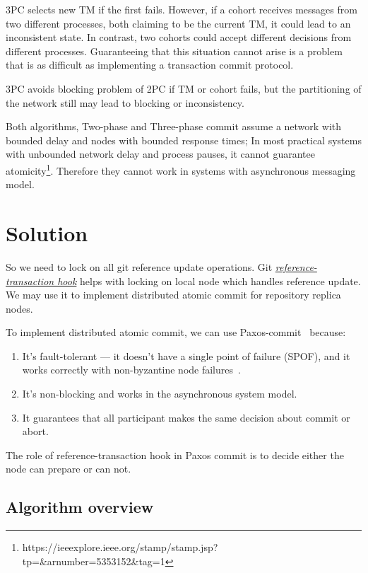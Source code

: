 \documentclass[sigplan, screen, nonacm, 11pt]{acmart}
\begin{document}
3PC selects new TM if the first fails.
However, if a cohort receives messages from two different processes,
both claiming to be the current TM, it could lead to an inconsistent state.
In contrast, two cohorts could accept different decisions from different processes.
Guaranteeing that this situation cannot arise is a problem
that is as difficult as implementing a transaction commit protocol.

3PC avoids blocking problem of 2PC if TM or cohort fails,
but the partitioning of the network still may lead to blocking or inconsistency.

Both algorithms, Two-phase and Three-phase commit assume a network with bounded delay and nodes with bounded response times;
In most practical systems with unbounded network delay and process pauses, it cannot guarantee atomicity\footnote{https://ieeexplore.ieee.org/stamp/stamp.jsp?tp=\&arnumber=5353152\&tag=1}.
Therefore they cannot work in systems with asynchronous messaging model.

\section{Solution}

So we need to lock on all git reference update operations.
Git \emph{\href{https://git-scm.com/docs/githooks.html\#\_reference\_transaction}{reference-transaction hook}}
helps with locking on local node which handles reference update. We may use it to implement distributed atomic commit
for repository replica nodes.

To implement distributed atomic commit, we can use Paxos-commit~\cite{paxos-commit} because:
\begin{enumerate}
  \item It's fault-tolerant --- it doesn't have a single point of failure (SPOF), and it works correctly with
    non-byzantine node failures~\cite{byzantine-generals}.
  \item It's non-blocking and works in the asynchronous system model.
  \item It guarantees that all participant makes the same decision about commit or abort.
\end{enumerate}

The role of reference-transaction hook in Paxos commit is to decide either the node can prepare or can not.

\subsection{Algorithm overview}
\end{document}
